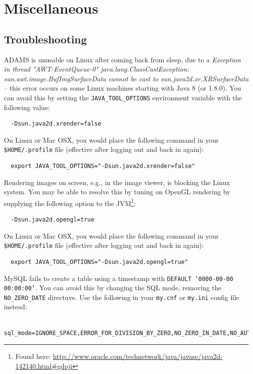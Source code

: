 
\chapter{Miscellaneous}

\section{Troubleshooting}
\begin{tight_itemize}
  \item ADAMS is unusable on Linux after coming back from sleep, due to a
  \textit{Exception in thread "AWT-EventQueue-0" java.lang.ClassCastException:
  sun.awt.image.BufImgSurfaceData cannot be cast to sun.java2d.xr.XRSurfaceData}
  -- this error occurs on some Linux machines starting with Java 8 (or 1.8.0).
  You can avoid this by setting the \texttt{JAVA\_TOOL\_OPTIONS} environment variable with the following value:
  \begin{verbatim}
  -Dsun.java2d.xrender=false
  \end{verbatim}
  On Linux or Mac OSX, you would place the following command in your
  \texttt{\$HOME/.profile} file (effective after logging out and back in again):
  \begin{verbatim}
  export JAVA_TOOL_OPTIONS="-Dsun.java2d.xrender=false"
  \end{verbatim}

  \item Rendering images on screen, e.g., in the image viewer, is blocking the
  Linux system. You may be able to resolve this by tuning on OpenGL rendering
  by supplying the following option to the JVM\footnote{Found here: \url{http://www.oracle.com/technetwork/java/javase/java2d-142140.html\#gdpji}{}}:
  \begin{verbatim}
  -Dsun.java2d.opengl=true
  \end{verbatim}
  On Linux or Mac OSX, you would place the following command in your
  \texttt{\$HOME/.profile} file (effective after logging out and back in again):
  \begin{verbatim}
  export JAVA_TOOL_OPTIONS="-Dsun.java2d.opengl=true"
  \end{verbatim}

  \item MySQL fails to create a table using a timestamp with \texttt{DEFAULT '0000-00-00 00:00:00'}.
  You can avoid this by changing the SQL mode, removing the \texttt{NO\_ZERO\_DATE} directuve.
  Use the following in your \texttt{my.cnf} or \texttt{my.ini} config file instead:
  {\scriptsize
  \begin{verbatim}
  sql_mode=IGNORE_SPACE,ERROR_FOR_DIVISION_BY_ZERO,NO_ZERO_IN_DATE,NO_AUTO_CREATE_USER,NO_ENGINE_SUBSTITUTION
  \end{verbatim}}
\end{tight_itemize}
